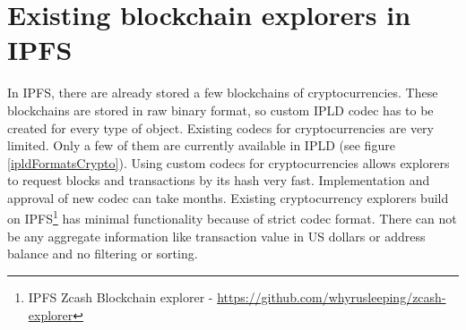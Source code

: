 \section{Existing blockchain explorers in IPFS}
In IPFS, there are already stored a few blockchains of cryptocurrencies. These blockchains are stored in raw binary format, so custom IPLD codec has to be created for every type of object. Existing codecs for cryptocurrencies are very limited. Only a few of them are currently available in IPLD (see figure  \ref{ipldFormatsCrypto}). Using custom codecs for cryptocurrencies allows explorers to request blocks and transactions by its hash very fast. Implementation and approval of new codec can take months. Existing cryptocurrency explorers build on IPFS\footnote{IPFS Zcash Blockchain explorer - \url{https://github.com/whyrusleeping/zcash-explorer}} has minimal functionality because of strict codec format. There can not be any aggregate information like transaction value in US dollars or address balance and no filtering or sorting.

